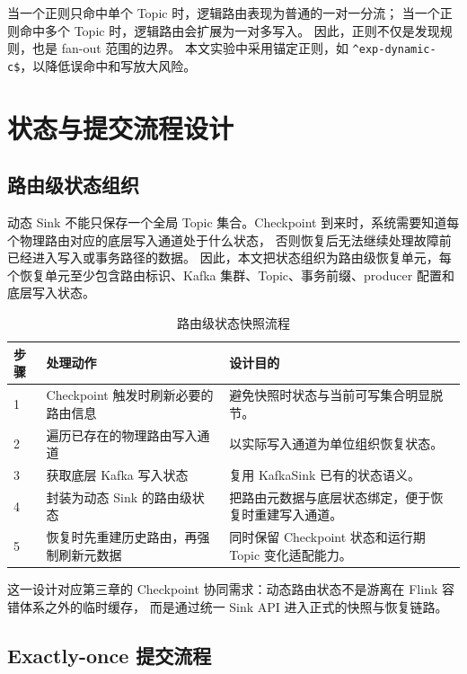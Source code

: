 当一个正则只命中单个 Topic 时，逻辑路由表现为普通的一对一分流；
当一个正则命中多个 Topic 时，逻辑路由会扩展为一对多写入。
因此，正则不仅是发现规则，也是 fan-out 范围的边界。
本文实验中采用锚定正则，如 \texttt{\^{}exp-dynamic-c\$}，以降低误命中和写放大风险。

\section{状态与提交流程设计}

\subsection{路由级状态组织}

动态 Sink 不能只保存一个全局 Topic 集合。Checkpoint 到来时，系统需要知道每个物理路由对应的底层写入通道处于什么状态，
否则恢复后无法继续处理故障前已经进入写入或事务路径的数据。
因此，本文把状态组织为路由级恢复单元，每个恢复单元至少包含路由标识、Kafka 集群、Topic、事务前缀、producer 配置和底层写入状态。

\begin{table}[htbp]
  \centering
  \caption{路由级状态快照流程}
  \label{tab:checkpoint-flow}
  \begin{tabular}{p{}p{}p{}}
    \toprule
    步骤 & 处理动作 & 设计目的 \\
    \midrule
    1 & Checkpoint 触发时刷新必要的路由信息 & 避免快照时状态与当前可写集合明显脱节。 \\
    2 & 遍历已存在的物理路由写入通道 & 以实际写入通道为单位组织恢复状态。 \\
    3 & 获取底层 Kafka 写入状态 & 复用 KafkaSink 已有的状态语义。 \\
    4 & 封装为动态 Sink 的路由级状态 & 把路由元数据与底层状态绑定，便于恢复时重建写入通道。 \\
    5 & 恢复时先重建历史路由，再强制刷新元数据 & 同时保留 Checkpoint 状态和运行期 Topic 变化适配能力。 \\
    \bottomrule
  \end{tabular}
\end{table}

这一设计对应第三章的 Checkpoint 协同需求：动态路由状态不是游离在 Flink 容错体系之外的临时缓存，
而是通过统一 Sink API 进入正式的快照与恢复链路。

\subsection{Exactly-once 提交流程}

